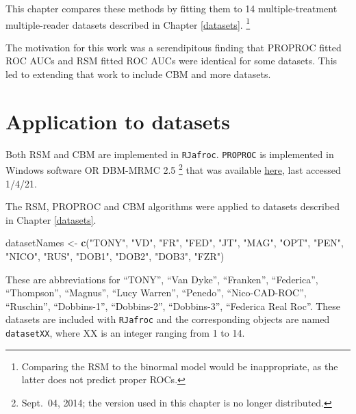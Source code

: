 \documentclass[
]{book}
\newenvironment{Shaded}{\begin{snugshade}}{\end{snugshade}}
\newcommand{\KeywordTok}[1]{\textcolor[rgb]{0.13,0.29,0.53}{\textbf{#1}}}
\newcommand{\NormalTok}[1]{#1}
\newcommand{\StringTok}[1]{\textcolor[rgb]{0.31,0.60,0.02}{#1}}
\begin{document}
This chapter compares these methods by fitting them to 14 multiple-treatment multiple-reader datasets described in Chapter \ref{datasets}. \footnote{Comparing the RSM to the binormal model would be inappropriate, as the latter does not predict proper ROCs.}

The motivation for this work was a serendipitous finding \citep{chakraborty2011estimating} that PROPROC fitted ROC AUCs and RSM fitted ROC AUCs were identical for some datasets. This led to extending that work to include CBM and more datasets.

\hypertarget{rsm-3-fits-applications}{%
\section{Application to datasets}\label{rsm-3-fits-applications}}

Both RSM and CBM are implemented in \texttt{RJafroc}. \texttt{PROPROC} is implemented in Windows software OR DBM-MRMC 2.5 \footnote{Sept.~04, 2014; the version used in this chapter is no longer distributed.} that was available \href{https://perception.lab.uiowa.edu/software}{here}, last accessed 1/4/21.

The RSM, PROPROC and CBM algorithms were applied to datasets described in Chapter \ref{datasets}.

\begin{Shaded}
\begin{Highlighting}[]
\NormalTok{datasetNames <-}\StringTok{  }
\StringTok{  }\KeywordTok{c}\NormalTok{(}\StringTok{"TONY"}\NormalTok{, }\StringTok{"VD"}\NormalTok{, }\StringTok{"FR"}\NormalTok{, }
  \StringTok{"FED"}\NormalTok{, }\StringTok{"JT"}\NormalTok{, }\StringTok{"MAG"}\NormalTok{, }
  \StringTok{"OPT"}\NormalTok{, }\StringTok{"PEN"}\NormalTok{, }\StringTok{"NICO"}\NormalTok{,}
  \StringTok{"RUS"}\NormalTok{, }\StringTok{"DOB1"}\NormalTok{, }\StringTok{"DOB2"}\NormalTok{, }
  \StringTok{"DOB3"}\NormalTok{, }\StringTok{"FZR"}\NormalTok{)}
\end{Highlighting}
\end{Shaded}

These are abbreviations for ``TONY'', ``Van Dyke'', ``Franken'', ``Federica'', ``Thompson'', ``Magnus'', ``Lucy Warren'', ``Penedo'', ``Nico-CAD-ROC'', ``Ruschin'', ``Dobbins-1'', ``Dobbins-2'', ``Dobbins-3'', ``Federica Real Roc''. These datasets are included with \texttt{RJafroc} and the corresponding objects are named \texttt{datasetXX}, where XX is an integer ranging from 1 to 14.
\end{document}
